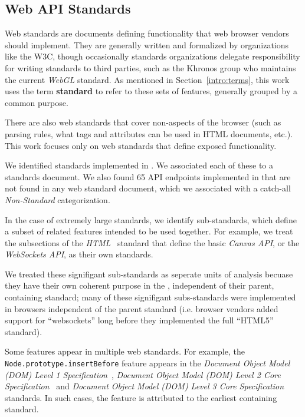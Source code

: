 \subsection{Web API Standards}
\label{measurement:data-sources:method-web-standards}
Web standards are documents defining functionality that web browser vendors
should implement.  They are generally written and formalized by organizations
like the W3C, though occasionally standards organizations delegate
responsibility for writing standards to third parties, such as the Khronos
group who maintains the current \textit{WebGL} standard.  As mentioned in
Section~\ref{intro:terms}, this work uses the term \textbf{standard} to refer
to these sets of features, generally grouped by a common purpose.

There are also web standards that cover non-\JS aspects of the browser (such
as parsing rules, what tags and attributes can be used in HTML documents,
etc.). This work focuses only on web standards that define \JS exposed
functionality.

We identified \numstandards standards implemented in \FF.  We associated each
of these to a standards document.  We also found 65 API endpoints implemented
in \FF that are not found in any web standard document, which we associated
with a catch-all \textit{Non-Standard} categorization.

In the case of extremely large standards, we identify sub-standards, which
define a subset of related features intended to be used together.  For example,
we treat the subsections of the \textit{HTML}~\cite{whatwg2018html} standard
that define the basic \textit{Canvas API}, or the \textit{WebSockets API}, as
their own standards.

We treated these signifigant sub-standards as seperate units of analysis
becuase they have their own coherent purpose in the \WAPI, independent
of their parent, containing standard; many of these signifigant subs-standards
were implemented in browsers independent of the parent standard (i.e. browser
vendors added support for ``websockets'' long before they implemented the full
``HTML5'' standard).

Some features appear in multiple web standards.  For example, the
\texttt{Node.prototype.insertBefore} feature appears in the \textit{Document
Object Model (DOM) Level 1 Specification}~\cite{dom1w3c}, \textit{Document
Object Model (DOM) Level 2 Core Specification}~\cite{dom2corew3c} and
\emph{Document Object Model (DOM) Level 3 Core
Specification}~\cite{dom3corew3c} standards.  In such cases, the feature is
attributed to the earliest containing standard.


